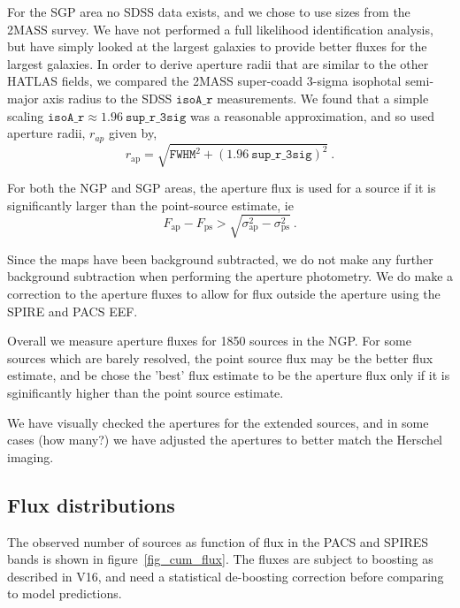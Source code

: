\documentclass[useAMS,usenatbib]{mn2e}
\begin{document}
For the SGP area no SDSS data exists, and we chose to use sizes
from the 2MASS survey. We have not performed a full likelihood
identification analysis, but have simply looked at the largest
galaxies to provide better fluxes for the largest galaxies. 
In order to derive aperture radii that are similar to the other HATLAS
fields, we compared the 2MASS super-coadd 3-sigma isophotal semi-major
axis radius to the SDSS $\mathtt {isoA\_r}$ measurements. We found that a
simple scaling $\mathtt{isoA\_r} \approx 1.96 \ \mathtt{sup\_r\_3sig}$
was a reasonable approximation, and so used aperture radii, $r_{ap}$
given by, 
\begin{equation} 
r_\mathrm{ap} = \sqrt{ \mathtt{FWHM}^2 + {(1.96
    \ \mathtt{sup\_r\_3sig})}^2}\ .
\end{equation}

For both the NGP and SGP areas, the aperture flux is used for a source
if it is significantly larger than the point-source estimate, ie
\begin{equation} 
F_\mathrm{ap}- F_\mathrm{ps}>\sqrt{\sigma_\mathrm{ap}^2-\sigma_\mathrm{ps}^2}
\ .
\end{equation}

Since the maps have been background subtracted, we do not make any
further background subtraction when performing the aperture
photometry. We do make a correction to the aperture fluxes to allow
for flux outside the aperture using the SPIRE and PACS EEF.

Overall we measure aperture fluxes for 1850 sources in the NGP. For
some sources which are barely resolved, the point source flux may be
the better flux estimate, and be chose the 'best' flux estimate to be
the aperture flux only if it is sginificantly higher than the point
source estimate. 

We have visually checked the apertures for the extended sources, and
in some cases (how many?) we have adjusted the apertures to better
match the Herschel imaging. 

\subsection{Flux distributions} 

The observed number of sources as  function of flux in the PACS and
SPIRES bands is shown in figure~\ref{fig_cum_flux}. The fluxes are
subject to boosting as described in V16, and need a statistical
de-boosting correction before  comparing to model predictions. 
\end{document}
